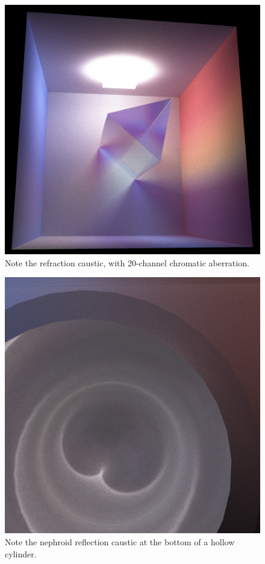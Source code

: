 \documentclass[12pt]{article}
\begin{document}
\begin{figure} 
\centering
  \includegraphics[width = 6 in]{fig7.png}
  \caption{ Note the refraction caustic, with 20-channel chromatic aberration.
}
\end{figure}


\begin{figure} 
\centering
  \includegraphics[width = 6 in]{fig8.png}
  \caption{ Note the nephroid reflection caustic at the bottom of a hollow cylinder.
}
\end{figure}
\end{document}
